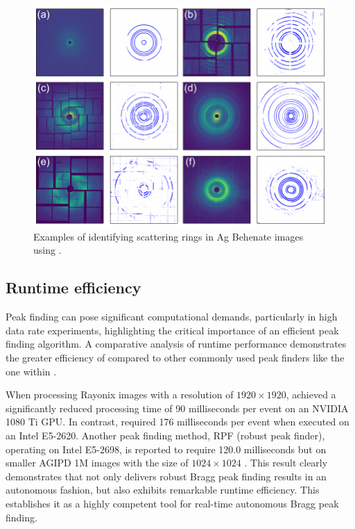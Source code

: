 \documentclass[a4paper]{article}
\begin{document}
\begin{figure}[!ht]
\centering
\includegraphics[width=\textwidth,keepaspectratio]
{./figures/automask.agbehnate.pdf}
\caption{Examples of identifying scattering rings in Ag Behenate images using
\peaknet{}.}
\label{fig : automask 2}
\end{figure}


\subsection{Runtime efficiency}

Peak finding can pose significant computational demands, particularly in high
data rate experiments, highlighting the critical importance of an efficient peak
finding algorithm.  A comparative analysis of runtime performance demonstrates
the greater efficiency of \peaknet{} compared to other commonly used peak
finders like the one within \psocake{}.

When processing Rayonix images with a resolution of $1920 \times 1920$,
\peaknet{} achieved a significantly reduced processing time of 90 milliseconds
per event on an NVIDIA 1080 Ti GPU.  In contrast, \psocake{} required 176
milliseconds per event when executed on an Intel E5-2620.  Another peak finding
method, RPF (robust peak finder), operating on Intel E5-2698, is reported to
require 120.0 milliseconds but on smaller AGIPD 1M images with the size of $1024
\times 1024$ \citep{hadian-jaziDataReductionSerial2021}.  This result clearly
demonstrates that \peaknet{} not only delivers robust Bragg peak finding results
in an autonomous fashion, but also exhibits remarkable runtime efficiency.  This
establishes it as a highly competent tool for real-time autonomous Bragg peak
finding.
\end{document}
